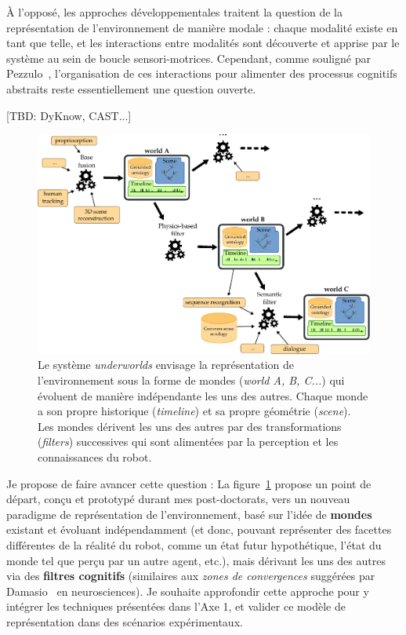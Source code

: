 \documentclass[a4paper]{article}
\begin{document}
À l'opposé, les approches développementales traitent la question de la
représentation de l'environnement de manière modale : chaque modalité existe en
tant que telle, et les interactions entre modalités sont découverte et apprise
par le système au sein de boucle sensori-motrices. Cependant, comme souligné
par Pezzulo~\cite{pezzulo2012computational}, l'organisation de ces interactions
pour alimenter des processus cognitifs abstraits reste essentiellement une
question ouverte.

[TBD: DyKnow, CAST...]

\begin{figure}
    \centering
\includegraphics[width=1.0\textwidth]{figs/worlds}
\caption{\small Le système \emph{underworlds} envisage la représentation de
    l'environnement sous la forme de mondes (\emph{world A, B, C...}) qui
    évoluent de manière indépendante les uns des autres. Chaque monde a son
    propre historique (\emph{timeline}) et sa propre géométrie (\emph{scene}).
    Les mondes dérivent les uns des autres par des transformations
    (\emph{filters}) successives qui sont alimentées par la perception et les
    connaissances du robot.  }

\label{worlds}
\end{figure}

Je propose de faire avancer cette question : La figure~\ref{worlds} propose un
point de départ, conçu et prototypé durant mes post-doctorats, vers un nouveau
paradigme de représentation de l'environnement, basé sur l'idée de
\textbf{mondes} existant et évoluant indépendamment (et donc, pouvant
représenter des facettes différentes de la réalité du robot, comme un état futur
hypothétique, l'état du monde tel que perçu par un autre agent, etc.), mais
dérivant les uns des autres via des \textbf{filtres cognitifs} (similaires aux
\emph{zones de convergences} suggérées par Damasio~\cite{damasio1989time} en
neurosciences). Je souhaite approfondir cette approche pour y intégrer les
techniques présentées dans l'Axe 1, et valider ce modèle de représentation dans
des scénarios expérimentaux.
\end{document}
